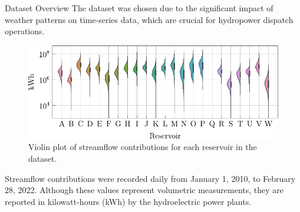 \begin{frame}{Dataset Overview}
	The dataset was chosen due to the significant impact of weather patterns on time-series data, which are crucial for hydropower dispatch operations.
	
	\vspace{10pt}
	
	\begin{figure}[htbp]
		\centering
		\includegraphics[height=0.25\textwidth]{images/ct_violinplot.pdf}
		\caption{Violin plot of streamflow contributions for each reservoir in the dataset.}
	\end{figure}
	
	Streamflow contributions were recorded daily from January 1, 2010, to February 28, 2022. Although these values represent volumetric measurements, they are reported in kilowatt-hours (kWh) by the hydroelectric power plants.
\end{frame}
